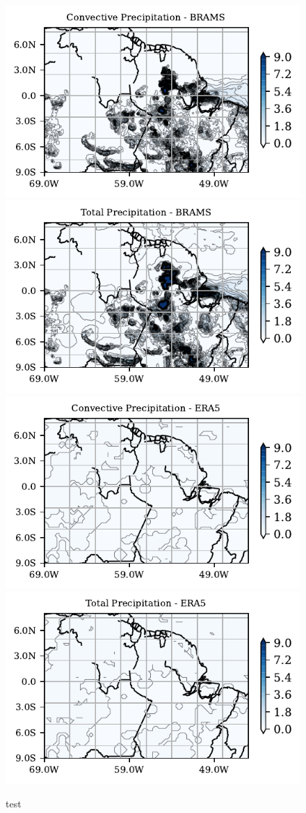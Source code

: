 \documentclass{article}
\begin{document}

\begin{figure}
	\centering
	\includegraphics[width=0.25\linewidth]{conv_secaCP00.pdf}
	\includegraphics[width=0.25\linewidth]{total_secaCP00.pdf}
	\includegraphics[width=0.25\linewidth]{conv_ERA.pdf}
	\includegraphics[width=0.25\linewidth]{total_ERA5.pdf}
	\caption{test}
\end{figure}
\end{document}
